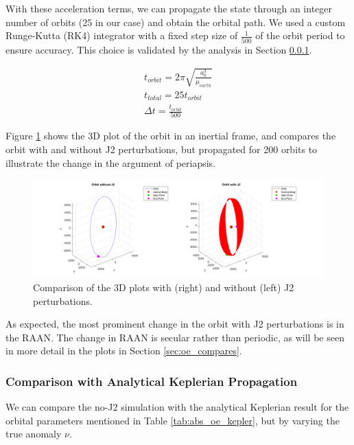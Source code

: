 With these acceleration terms, we can propagate the state through an integer number of orbits (25 in our case) and obtain the orbital path. We used a custom Runge-Kutta (RK4) integrator with a fixed step size of $\frac{1}{500}$ of the orbit period to ensure accuracy. This choice is validated by the analysis in Section \ref{sec:analytical_and_eci2rtn}.

\begin{align}
    t_{orbit} = 2\pi \sqrt{\frac{a_0^3}{\mu_{earth}}} \\
    t_{total} = 25t_{orbit} \\
    \Delta t = \frac{t_{orbit}}{500} \label{eq:timestep}%
\end{align}

Figure \ref{fig:3d_plots_with_j2} shows the 3D plot of the orbit in an inertial frame, and compares the orbit with and without J2 perturbations, but propagated for 200 orbits to illustrate the change in the argument of periapsis. 

\begin{figure}[H]
    \centering
    \includegraphics[width=1.1\linewidth]{PS1/Figures/Orbit_J2_Comparison_ECI.jpg}
    \caption{Comparison of the 3D plots with (right) and without (left) J2 perturbations. }
    \label{fig:3d_plots_with_j2}
\end{figure}

As expected, the most prominent change in the orbit with J2 perturbations is in the RAAN. The change in RAAN is secular rather than periodic, as will be seen in more detail in the plots in Section \ref{sec:oe_compares}.

\subsubsection{Comparison with Analytical Keplerian Propagation} \label{sec:analytical_and_eci2rtn}

We can compare the no-J2 simulation with the analytical Keplerian result for the orbital parameters mentioned in Table \ref{tab:abs_oe_kepler}, but by varying the true anomaly $\nu$. 

